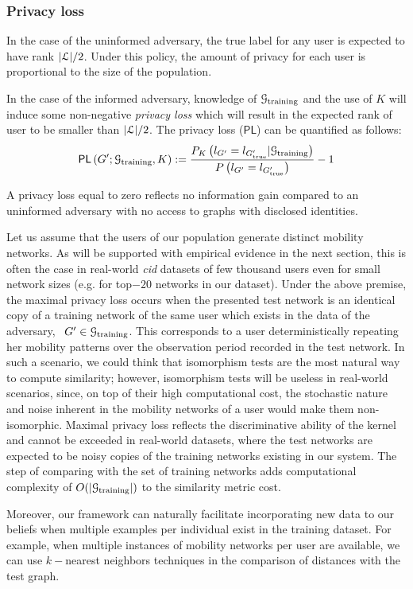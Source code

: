\subsubsection{Privacy loss}

In the case of the uninformed adversary, the true label for any user is expected to have rank $ |\mathcal{L}|/2$. Under this policy, the amount of privacy for each user is proportional to the size of the population.

In the case of the informed adversary, knowledge of $ \mathcal{G}_\text{training} $ and the use of $ K $ will induce some non-negative \emph{privacy loss} which will result in the expected rank of user to be smaller than $ |\mathcal{L}|/2$. The privacy loss ($\mathsf{PL}$) can be quantified as follows:
\[
	\mathsf{PL}\left(G';\mathcal{G}_{\text{training}}, K\right) := \frac{P_K\left(l_{G'}= l_{G'_\text{true}}|\mathcal{G}_{\text{training}}\right)}{P\left(l_{G'}= l_{G'_\text{true}}\right)} -1
	\label{eq:privloss}
\]

A privacy loss equal to zero reflects no information gain compared to an uninformed adversary with no access to graphs with disclosed identities.

Let us assume that the users of our population generate distinct mobility networks.
As will be supported with empirical evidence in the next section, this is often the case in real-world \emph{cid} datasets of few thousand users even for small network sizes (e.g. for top$-20$ networks in our dataset).
Under the above premise, the maximal privacy loss occurs when the presented test network is an identical copy of a training network of the same user which exists in the data of the adversary, \ie\ $ G' \in \mathcal{G}_\text{training}$.
This corresponds to a user deterministically repeating her mobility patterns over the observation period recorded in the test network.
In such a scenario, we could think that isomorphism tests are the most natural way to compute similarity; however, isomorphism tests will be useless in real-world scenarios, since, on top of their high computational cost, the stochastic nature and noise inherent in the mobility networks of a user would make them non-isomorphic.
Maximal privacy loss reflects the discriminative ability of the kernel and cannot be exceeded in real-world datasets, where the test networks are expected to be noisy copies of the training networks existing in our system.
The step of comparing with the set of training networks adds computational complexity of $O(|\mathcal{G}_{\text{training}}|)$ to the similarity metric cost.

Moreover, our framework can naturally facilitate incorporating new data to our beliefs when multiple examples per individual exist in the training dataset.
For example, when multiple instances of mobility networks per user are available, we can use $k-$nearest neighbors techniques in the comparison of distances with the test graph.
